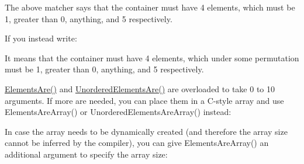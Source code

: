 \begin{DoxyCode}{0}
\DoxyCodeLine{}
\DoxyCodeLine{}
\end{DoxyCode}


The above matcher says that the container must have 4 elements, which must be 1, greater than 0, anything, and 5 respectively.

If you instead write\+:


\begin{DoxyCode}{0}
\DoxyCodeLine{}
\DoxyCodeLine{}
\end{DoxyCode}


It means that the container must have 4 elements, which under some permutation must be 1, greater than 0, anything, and 5 respectively.

{\ttfamily \mbox{\hyperlink{namespacetesting_a79cf4ae694bf8231dcf283b325405f27}{Elements\+Are()}}} and {\ttfamily \mbox{\hyperlink{namespacetesting_a8622c12aadfa0e60f7d68683eeb21115}{Unordered\+Elements\+Are()}}} are overloaded to take 0 to 10 arguments. If more are needed, you can place them in a C-\/style array and use {\ttfamily Elements\+Are\+Array()} or {\ttfamily Unordered\+Elements\+Are\+Array()} instead\+:


\begin{DoxyCode}{0}
\DoxyCodeLine{}
\DoxyCodeLine{}
\end{DoxyCode}


In case the array needs to be dynamically created (and therefore the array size cannot be inferred by the compiler), you can give {\ttfamily Elements\+Are\+Array()} an additional argument to specify the array size\+:


